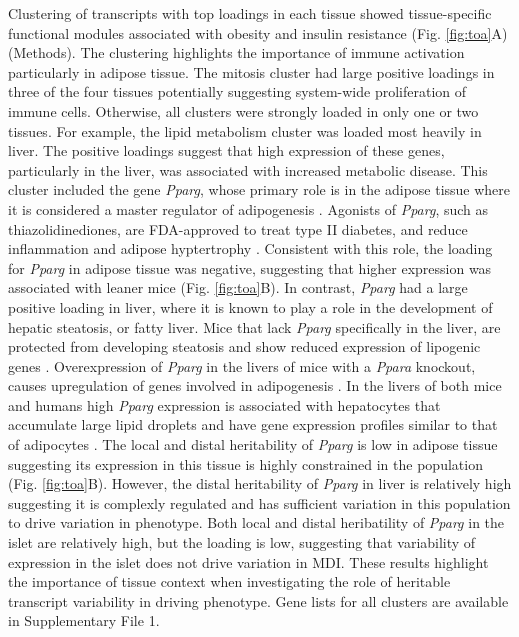 \documentclass[
]{article}
\begin{document}
Clustering of transcripts with top loadings in each tissue showed
tissue-specific functional modules associated with obesity and insulin
resistance (Fig. \ref{fig:toa}A) (Methods). The clustering highlights
the importance of immune activation particularly in adipose tissue. The
mitosis cluster had large positive loadings in three of the four tissues
potentially suggesting system-wide proliferation of immune cells.
Otherwise, all clusters were strongly loaded in only one or two tissues.
For example, the lipid metabolism cluster was loaded most heavily in
liver. The positive loadings suggest that high expression of these
genes, particularly in the liver, was associated with increased
metabolic disease. This cluster included the gene \textit{Pparg}, whose
primary role is in the adipose tissue where it is considered a master
regulator of adipogenesis \cite{pmid17389767}. Agonists of
\textit{Pparg}, such as thiazolidinediones, are FDA-approved to treat
type II diabetes, and reduce inflammation and adipose hyptertrophy
\cite{pmid17389767}. Consistent with this role, the loading for
\textit{Pparg} in adipose tissue was negative, suggesting that higher
expression was associated with leaner mice (Fig. \ref{fig:toa}B). In
contrast, \textit{Pparg} had a large positive loading in liver, where it
is known to play a role in the development of hepatic steatosis, or
fatty liver. Mice that lack \textit{Pparg} specifically in the liver,
are protected from developing steatosis and show reduced expression of
lipogenic genes \cite{pmid12805374, pmid12618528}. Overexpression of
\textit{Pparg} in the livers of mice with a \textit{Ppara} knockout,
causes upregulation of genes involved in adipogenesis
\cite{pmid16357043}. In the livers of both mice and humans high
\textit{Pparg} expression is associated with hepatocytes that accumulate
large lipid droplets and have gene expression profiles similar to that
of adipocytes \cite{pmid15644454, pmid16403437}. The local and distal
heritability of \textit{Pparg} is low in adipose tissue suggesting its
expression in this tissue is highly constrained in the population (Fig.
\ref{fig:toa}B). However, the distal heritability of \textit{Pparg} in
liver is relatively high suggesting it is complexly regulated and has
sufficient variation in this population to drive variation in phenotype.
Both local and distal heribatility of \textit{Pparg} in the islet are
relatively high, but the loading is low, suggesting that variability of
expression in the islet does not drive variation in MDI. These results
highlight the importance of tissue context when investigating the role
of heritable transcript variability in driving phenotype. Gene lists for
all clusters are available in Supplementary File 1.
\end{document}
